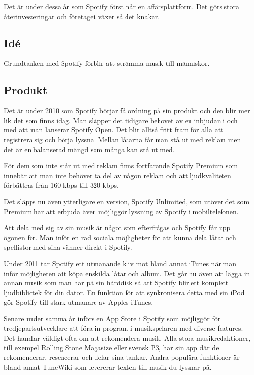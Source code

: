 Det är under dessa år som Spotify först når en affärsplattform. Det görs stora återinvesteringar och företaget växer så det knakar. 

\subsection{Idé}
Grundtanken med Spotify förblir att strömma musik till människor. 

\subsection{Produkt}
Det är under 2010 som Spotify börjar få ordning på sin produkt och den blir mer lik det som finns idag. Man släpper det tidigare behovet av en inbjudan i och med att man lanserar Spotify Open. Det blir alltså fritt fram för alla att registrera sig och börja lyssna. Mellan låtarna får man stå ut med reklam men det är en balanserad mängd som många kan stå ut med. 

För dem som inte står ut med reklam finns fortfarande Spotify Premium som innebär att man inte behöver ta del av någon reklam och att 
ljudkvaliteten förbättras från 160 kbps till 320 kbps. 

Det släpps nu även ytterligare en version, Spotify Unlimited, som utöver det som Premium har att erbjuda även möjliggör lyssning av Spotify i mobiltelefonen.


Att dela med sig av sin musik är något som efterfrågas och Spotify får upp ögonen för. Man inför en rad sociala möjligheter för att kunna dela låtar och spellistor med sina vänner direkt i Spotify. 

Under 2011 tar Spotify ett utmanande kliv mot bland annat iTunes när man inför möjligheten att köpa enskilda låtar och album. Det går nu även att lägga in annan musik som man har på sin hårddisk så att Spotify blir ett komplett ljudbibliotek för din dator. En funktion för att synkronisera detta med sin iPod gör Spotify till stark utmanare av Apples iTunes.

Senare under samma år införs en App Store i Spotify som möjliggör för tredjepartsutvecklare att föra in program i musikspelaren med diverse features. Det handlar väldigt ofta om att rekomendera musik. Alla stora musikredaktioner, till exempel Rolling Stone Magasize eller svensk P3, har sin app där de rekomenderar, resencerar och delar sina tankar. Andra populära funktioner är bland annat TuneWiki som levererar texten till musik du lyssnar på.

